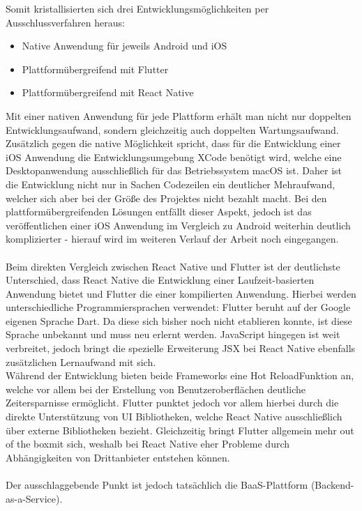 Somit kristallisierten sich drei Entwicklungsmöglichkeiten per Ausschlussverfahren heraus:
\begin{itemize}
	\item Native Anwendung für jeweils Android und iOS
	\item Plattformübergreifend mit Flutter
	\item Plattformübergreifend mit React Native
\end{itemize}

Mit einer nativen Anwendung für jede Plattform erhält man nicht nur doppelten Entwicklungsaufwand, sondern gleichzeitig auch doppelten Wartungsaufwand. 
Zusätzlich gegen die native Möglichkeit spricht, dass für die Entwicklung einer iOS Anwendung die Entwicklungsumgebung XCode benötigt wird, welche eine Desktopanwendung ausschließlich für das Betriebssystem macOS ist.
Daher ist die Entwicklung nicht nur in Sachen Codezeilen ein deutlicher Mehraufwand, welcher sich aber bei der Größe des Projektes nicht bezahlt macht.
Bei den plattformübergreifenden Lösungen entfällt dieser Aspekt, jedoch ist das veröffentlichen einer iOS Anwendung im Vergleich zu Android weiterhin deutlich komplizierter - hierauf wird im weiteren Verlauf der Arbeit noch eingegangen.\\
\\
Beim direkten Vergleich zwischen React Native und Flutter ist der deutlichste Unterschied, dass React Native die Entwicklung einer Laufzeit-basierten Anwendung bietet und Flutter die einer kompilierten Anwendung.
Hierbei werden unterschiedliche Programmiersprachen verwendet: Flutter beruht auf der Google eigenen Sprache Dart. 
Da diese sich bisher noch nicht etablieren konnte, ist diese Sprache unbekannt und muss neu erlernt werden.
JavaScript hingegen ist weit verbreitet, jedoch bringt die spezielle Erweiterung JSX bei React Native ebenfalls zusätzlichen Lernaufwand mit sich.\\
Während der Entwicklung bieten beide Frameworks eine \glqq Hot Reload\grqq Funktion an, welche vor allem bei der Erstellung von Benutzeroberflächen deutliche Zeitersparnisse ermöglicht.
Flutter punktet jedoch vor allem hierbei durch die direkte Unterstützung von UI Bibliotheken, welche React Native ausschließlich über externe Bibliotheken bezieht. 
Gleichzeitig bringt Flutter allgemein mehr \glqq out of the box\grqq mit sich, weshalb bei React Native eher Probleme durch Abhängigkeiten von Drittanbieter entstehen können. \\
\\
Der ausschlaggebende Punkt ist jedoch tatsächlich die BaaS-Plattform (Backend-as-a-Service).
